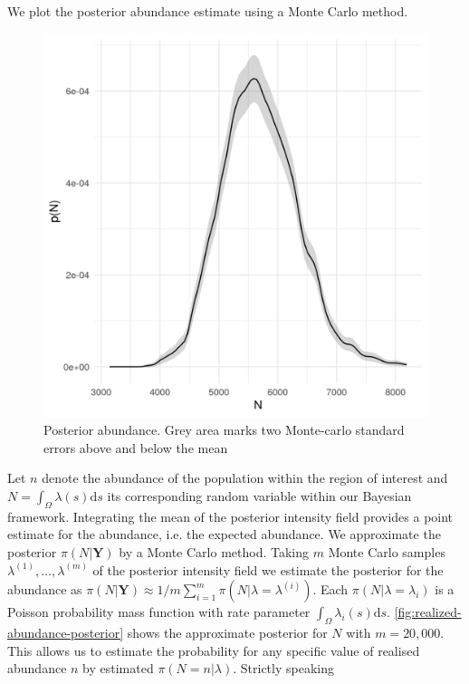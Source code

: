 \documentclass{stylefile16/statsoc}
\newcommand{\bm}{\boldsymbol}  %
\begin{document}
We plot the posterior abundance estimate using a Monte Carlo method.
\begin{figure}[h]
	\begin{center}
		\includegraphics[scale=0.525]{figures/N_posterior.png}
		\caption{Posterior abundance.  Grey area marks two Monte-carlo standard errors above and below the mean}
		\label{fig:realized-abundance-posterior}
	\end{center}
\end{figure}
Let $n$ denote the abundance of the population within the region of interest and $N = \int_{\Omega}\lambda(s)\mathrm{d}s$ its corresponding random variable within our Bayesian framework.  Integrating the mean of the posterior intensity field provides a point estimate for the abundance, i.e. the expected abundance.  We approximate the posterior $\pi(N | \bm{Y})$ by a Monte Carlo method.  Taking $m$ Monte Carlo samples  $\lambda^{(1)}, \ldots, \lambda^{(m)}$ of the posterior intensity field we estimate the posterior for the abundance as $\pi(N | \bm{Y}) \approx 1 / m \sum_{i=1}^m \pi (N | \lambda = \lambda^{(i)})$. Each $\pi(N | \lambda = \lambda_i)$ is a Poisson probability mass function with rate parameter $\int_{\Omega}\lambda_i(s)\mathrm{d}s$. \autoref{fig:realized-abundance-posterior} shows the approximate posterior for $N$ with $m = 20,000$.  This allows us to estimate the probability for any specific value of realised abundance $n$ by estimated $\pi(N = n | \lambda)$.  Strictly speaking
\end{document}

